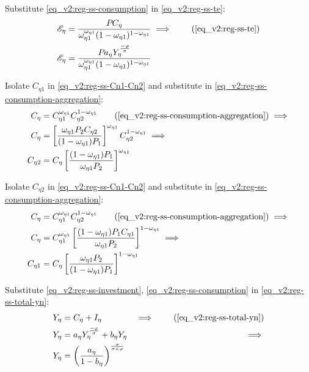 \documentclass[../thesis.tex]{subfiles}
\begin{document}
	Substitute \ref{eq_v2:reg-ss-consumption} in \ref{eq_v2:reg-ss-te}:
	\begin{align}
		\te[] &= \frac{P_{} C_{\eta}}{\omega_{\eta 1}^{\omega_{\eta 1}} (1 -\omega_{\eta 1})^{1 -\omega_{\eta 1}}} \implies \tag{\ref{eq_v2:reg-ss-te}} \\
		\te[] &= \frac{P_{} a_{\eta} Y_{\eta}^{\frac{-\varphi}{\sigma}}}{\omega_{\eta 1}^{\omega_{\eta 1}} (1 -\omega_{\eta 1})^{1 -\omega_{\eta 1}}} \label{eq_v2:reg-ss-te-2}
	\end{align}


Isolate $C_{\eta 1}$ in \ref{eq_v2:reg-ss-Cn1-Cn2} and substitute in \ref{eq_v2:reg-ss-consumption-aggregation}:
\begin{align}
	C_{\eta} &= C_{\eta 1}^{\omega_{\eta 1}} C_{\eta 2}^{1-\omega_{\eta 1}} \tag{\ref{eq_v2:reg-ss-consumption-aggregation}} \implies \\
	C_{\eta} &= \left[ \frac{\omega_{\eta 1} P_{2} C_{\eta 2}}{(1 -\omega_{\eta 1}) P_{1}} \right]^{\omega_{\eta 1}} C_{\eta 2}^{1-\omega_{\eta 1}} \implies \nonumber \\
	C_{\eta 2} &= C_{\eta} \left[ \frac{(1 - \omega_{\eta 1}) P_{1}}{\omega_{\eta 1} P_{2}} \right]^{\omega_{\eta 1}} \label{eq_v2:reg-ss-C2-Cn-3}
\end{align}

Isolate $C_{\eta 2}$ in \ref{eq_v2:reg-ss-Cn1-Cn2} and substitute in \ref{eq_v2:reg-ss-consumption-aggregation}:
\begin{align}
	C_{\eta} &= C_{\eta 1}^{\omega_{\eta 1}} C_{\eta 2}^{1-\omega_{\eta 1}} \tag{\ref{eq_v2:reg-ss-consumption-aggregation}} \implies \\
	C_{\eta} &= C_{\eta 1}^{\omega_{\eta 1}} \left[ \frac{(1 -\omega_{\eta 1}) P_{1} C_{\eta 1}}{\omega_{\eta 1} P_{2}} \right]^{1-\omega_{\eta 1}} \implies \nonumber \\
	C_{\eta 1} &= C_{\eta} \left[ \frac{\omega_{\eta 1} P_{2}}{(1 - \omega_{\eta 1}) P_{1}} \right]^{1-\omega_{\eta 1}} \label{eq_v2:reg-ss-C1-Cn-3}
\end{align}


Substitute \ref{eq_v2:reg-ss-investment}, \ref{eq_v2:reg-ss-consumption} in \ref{eq_v2:reg-ss-total-yn}:
	\begin{alignat}{2}
		Y_{\eta} &= C_{\eta} + I_{\eta} &\implies \tag{\ref{eq_v2:reg-ss-total-yn}} \\
		Y_{\eta} &= a_{\eta} Y_{\eta}^{\frac{-\varphi}{\sigma}} + b_{\eta} Y_{\eta} &\implies \nonumber \\
		Y_{\eta} &= \left( \frac{a_{\eta}}{1 - b_{\eta}} \right)^{\frac{\sigma}{\sigma + \varphi}} \label{eq_v2:reg-ss-total-yn-2}
	\end{alignat}
\end{document}

